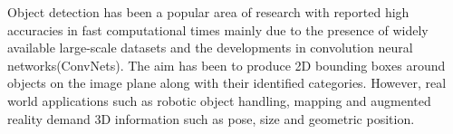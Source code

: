 \documentclass[10pt,twocolumn,letterpaper]{article}
\begin{document}
	Object detection has been a popular area of research with reported high accuracies in fast computational times mainly due to the presence of widely available large-scale datasets\cite{VOC2010,COCO2014,imagenet2015} and the developments in convolution neural networks(ConvNets). The aim has been to produce 2D bounding boxes around objects on the image plane along with their identified categories. However, real world applications such as robotic object handling, mapping and augmented reality demand 3D information such as pose, size and geometric position. 
	
	
\end{document}

